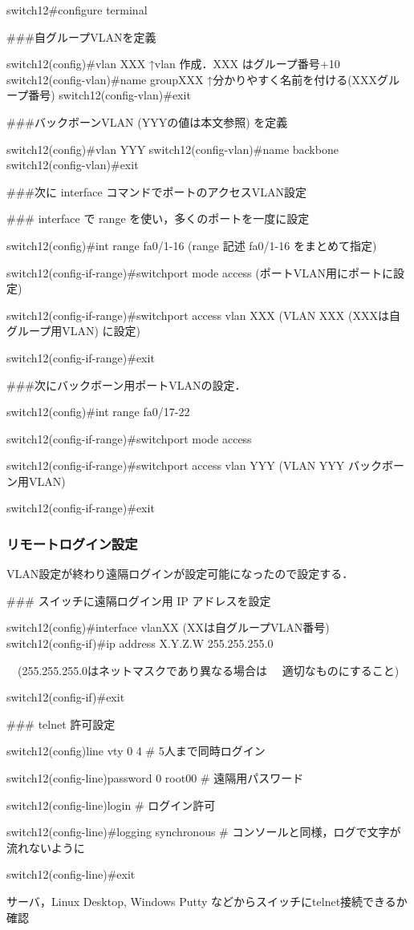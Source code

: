\begin{cli}
switch12#configure terminal

###自グループVLANを定義

switch12(config)#vlan XXX
                 ↑vlan 作成．XXX はグループ番号+10
switch12(config-vlan)#name groupXXX
                 ↑分かりやすく名前を付ける(XXXグループ番号)
switch12(config-vlan)#exit

###バックボーンVLAN (YYYの値は本文参照) を定義

switch12(config)#vlan YYY
switch12(config-vlan)#name backbone
switch12(config-vlan)#exit


###次に interface コマンドでポートのアクセスVLAN設定

### interface で range を使い，多くのポートを一度に設定

switch12(config)#int range fa0/1-16
  (range 記述 fa0/1-16 をまとめて指定)

switch12(config-if-range)#switchport mode access
  (ポートVLAN用にポートに設定)

switch12(config-if-range)#switchport access vlan XXX
  (VLAN XXX (XXXは自グループ用VLAN)  に設定)

switch12(config-if-range)#exit

###次にバックボーン用ポートVLANの設定．

switch12(config)#int range fa0/17-22

switch12(config-if-range)#switchport mode access

switch12(config-if-range)#switchport access vlan YYY
  (VLAN YYY バックボーン用VLAN)

switch12(config-if-range)#exit
\end{cli}

\subsubsection{リモートログイン設定}

VLAN設定が終わり遠隔ログインが設定可能になったので設定する．

\begin{cli}

### スイッチに遠隔ログイン用 IP アドレスを設定

switch12(config)#interface vlanXX (XXは自グループVLAN番号)
switch12(config-if)#ip address  X.Y.Z.W  255.255.255.0

　(255.255.255.0はネットマスクであり異なる場合は
　適切なものにすること)

switch12(config-if)#exit

### telnet 許可設定

switch12(config)line vty 0 4
  # 5人まで同時ログイン

switch12(config-line)password 0 root00
  # 遠隔用パスワード

switch12(config-line)login
  # ログイン許可
  
switch12(config-line)#logging synchronous
  # コンソールと同様，ログで文字が流れないように

switch12(config-line)#exit

サーバ，Linux Desktop, Windows Putty などからスイッチにtelnet接続できるか確認

\end{cli}

